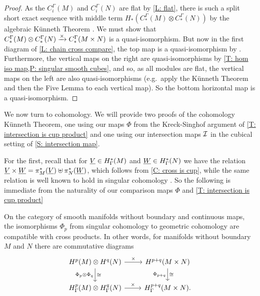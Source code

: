 \begin{proof}
	As the $C_i^\Gamma(M)$ and $C_i^\Gamma(N)$ are flat by \cref{L: flat}, there is such a split short exact sequence with middle term $H_*(C_*^\Gamma(M) \otimes C_*^\Gamma(N))$ by the algebraic K\"unneth Theorem \cite[Theorem V.2.1]{HS}.
	We must show that $C_*^\Gamma(M) \otimes C_*^\Gamma(N) \xrightarrow{\times} C_*^\Gamma(M \times N)$ is a quasi-isomorphism.
	But now in the first diagram of \cref{L: chain cross compare}, the top map is a quasi-isomorphism by
	 \cite[Theorem XI.3.1]{Mas91}.
	Furthermore, the vertical maps on the right are quasi-isomorphisms by \cref{T: hom iso map,P: singular smooth cubes}, and so, as all modules are flat, the vertical maps on the left are also quasi-isomorphisms (e.g.\ apply the K\"unneth Theorem and then the Five Lemma to each vertical map).
	So the bottom horizontal map is a quasi-isomorphism.
\end{proof}

We now turn to cohomology.
We will provide two proofs of the cohomology K\"unneth Theorem, one using our maps $\Phi$ from the Kreck-Singhof argument of \cref{T: intersection is cup product} and one using our intersection maps $\mathcal{I}$ in the cubical setting of \cref{S: intersection map}.

For the first, recall that for $\underline{V} \in H^*_\Gamma(M)$ and $\underline{W} \in H^*_\Gamma(N)$ we have the relation
$\underline{V} \times \underline{W} = \pi_M^*(\underline{V})\uplus\pi_N^*(\underline{W})$, which follows from \cref{C: cross is cup}, while the same relation is well known to hold in singular cohomology \cite[Corollary 5.6.14]{Span81}.
So the following is immediate from the naturality of our comparison maps $\Phi$ and \cref{T: intersection is cup product}

\begin{proposition}\label{P: cross product is cross product}
	On the category of smooth manifolds without boundary and continuous maps, the isomorphisms $\Phi_p$ from singular cohomology to geometric cohomology are compatible with cross products.
	In other words, for manifolds without boundary $M$ and $N$ there are commutative diagrams
	\[
	\begin{tikzcd}
		H^p(M) \otimes H^q(N) \arrow{r}{\times} \arrow[d,"\Phi_p \otimes \Phi_q"', "\cong"] &
		H^{p+q}(M \times N) \arrow[d, "\Phi_{p+q}"', "\cong"] \\
		H^p_\Gamma(M) \otimes H^q_\Gamma(N) \arrow{r}{\times} &
		H^{p+q}_\Gamma(M \times N).
	\end{tikzcd}
	\]
\end{proposition}

